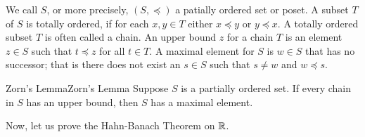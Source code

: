 We call $S$, or more precisely, $(S,\preceq)$ a patially ordered set or poset.
A subset $T$ of $S$ is totally ordered, if for each $x,y\in T$ either $x\preceq y$ or $y\preceq x$.
A totally ordered subset $T$ is often called a chain.
An upper bound $z$ for a chain $T$ is an element $z\in S$ such that $t\preceq z$ for all $t\in T$.
A maximal element for $S$ is $w\in S$ that has no successor; 
that is there does not exist an $s\in S$ such that $s\neq w$ and $w\preceq s$. 


\begin{theorem}{Zorn's Lemma}{Zorn's Lemma}
    Suppose $S$ is a partially ordered set.
    If every chain in $S$ has an upper bound, then $S$ has a maximal element.
\end{theorem}

Now, let us prove the Hahn-Banach Theorem on $\mathbb{R}$.
